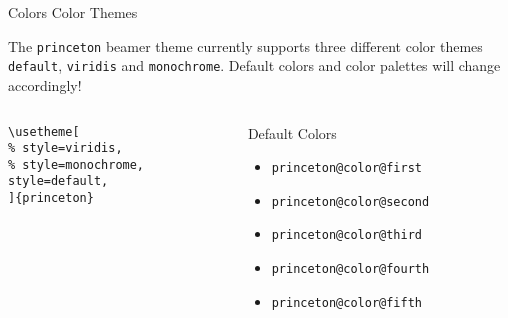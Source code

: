 \documentclass[aspectratio=169]{beamer}
\begin{document}
\begin{frame}[t,fragile]{Colors }{Color Themes}

The \texttt{princeton} beamer theme currently supports three different color themes \texttt{default},  \texttt{viridis} and \texttt{monochrome}. Default colors and color palettes will change accordingly!

\begin{columns}[T]
  \begin{column}{.33\textwidth}
    \begin{example}
\begin{lstlisting}
\usetheme[
% style=viridis,
% style=monochrome,
style=default,
]{princeton}
\end{lstlisting}
    \end{example}
  \end{column}
  
  \begin{column}{.33\textwidth}
    \begin{block}{Default Colors}
      \begin{itemize}
      \item \textcolor{princeton@color@first}{\texttt{princeton@color@first}}
      \item \textcolor{princeton@color@second}{\texttt{princeton@color@second}}
      \item \textcolor{princeton@color@third}{\texttt{princeton@color@third}}
      \item \textcolor{princeton@color@fourth}{\texttt{princeton@color@fourth}}
      \item \textcolor{princeton@color@fifth}{\texttt{princeton@color@fifth}}
      \end{itemize}
    \end{block}
  \end{column}


\end{columns}
\end{frame}
\end{document}
